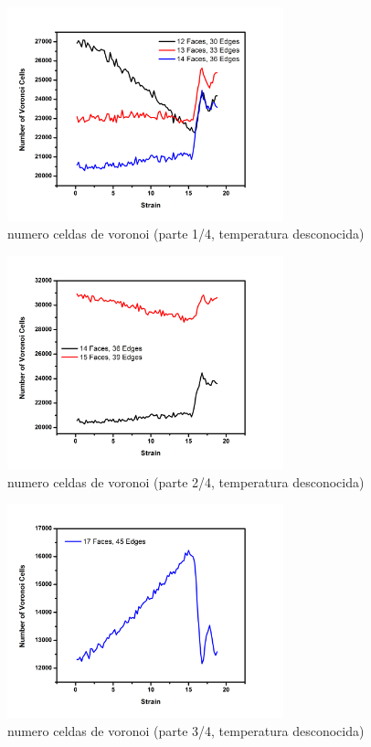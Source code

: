 \documentclass[10pt, oneside]{article} %
\begin{document}
\begin{figure}[H]
\centering
\includegraphics[width=8cm]{Figures/TRAC_Num_Step_B.png}
\caption{numero celdas de voronoi (parte 1/4, temperatura desconocida)}
\end{figure}

\begin{figure}[H]
\centering
\includegraphics[width=8cm]{Figures/TRAC_Num_Step_C.png}
\caption{numero celdas de voronoi (parte 2/4, temperatura desconocida)}
\end{figure}

\begin{figure}[H]
\centering
\includegraphics[width=8cm]{Figures/TRAC_Num_Step_D.png}
\caption{numero celdas de voronoi (parte 3/4, temperatura desconocida)}
\end{figure}
\end{document}
